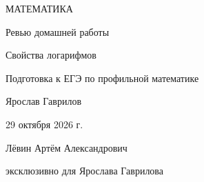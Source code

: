\documentclass[a4paper,12pt]{article}
\begin{document}
\thispagestyle{empty}
\begin{center}
\vspace*{29mm}
{\large\color{darkaccent}МАТЕМАТИКА}\par
\vspace{17mm}
{\Huge Ревью домашней работы}\par
\vspace{11mm}
{\LARGE\color{accent}Свойства логарифмов}\par
\vspace{8mm}
{\normalsize Подготовка к ЕГЭ по профильной математике}\par
\vfill
{\large Ярослав Гаврилов}\par
\vspace{14mm}
29 октября 2026 г.\par
\vspace{24mm}
{\small Лёвин Артём Александрович}\par
{\small эксклюзивно для Ярослава Гаврилова}\par
\vspace{14mm}
\end{center}
\newpage
\end{document}
